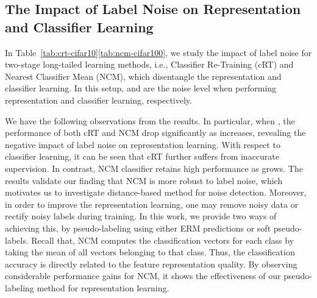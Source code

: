 \documentclass{article}
\begin{document}
\subsection{The Impact of Label Noise on Representation and Classifier Learning}
In Table~\ref{tab:crt-cifar10}\ref{tab:ncm-cifar100}, we study the impact of label noise for two-stage long-tailed learning methods, i.e., Classifier Re-Training (cRT) and Nearest Classifier Mean (NCM), which disentangle the representation and classifier learning. In this setup,  and  are the noise level when performing representation and classifier learning, respectively. 

We have the following observations from the results. In particular, when , the performance of both cRT and NCM drop significantly as  increases, revealing the negative impact of label noise on representation learning. With respect to classifier learning, it can be seen that cRT further suffers from inaccurate supervision. In contrast, NCM classifier retains high performance as  grows. The results validate our finding that NCM is more robust to label noise, which motivates us to investigate distance-based method for noise detection. Moreover, in order to improve the representation learning, one may remove noisy data or rectify noisy labels during training. In this work, we provide two ways of achieving this, by pseudo-labeling using either ERM predictions or soft pseudo-labels. Recall that, NCM computes the classification vectors for each class by taking the mean of all vectors belonging to that
class. Thus, the classification accuracy is directly related to the feature representation quality. By observing considerable performance gains for NCM, it shows the effectiveness of our pseudo-labeling method for representation learning.
\end{document}
